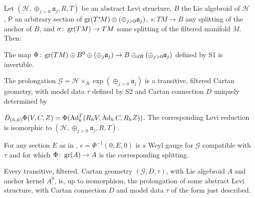 \documentclass[leqno,12pt]{amsart} %
\begin{document}
\begin{theorem}\mbox{}\newline
  Let $({\mathcal H}, \oplus_{j>0}{\mathfrak a}_j, R, T)$ be an abstract Levi structure,
  $B$ the Lie algebroid of ${\mathcal H} $, $\mathsf{P}$ an arbitrary section of
  $\operatorname{\operatorname{gr}}(T^*\!M)\otimes(\oplus_{j>0}{\mathfrak a}_j)$, $s \colon TM \rightarrow B$ any
  splitting of the anchor of $B$, and $\sigma \colon \operatorname{\operatorname{gr}}(TM) \rightarrow TM $ some
  splitting of the filtered manifold $M$. Then:
  \begin{conditions}
  \item\label{chh01} The map
    $\Phi \colon \operatorname{\operatorname{gr}}(TM) \oplus B^0 \oplus (\oplus_j {\mathfrak a}_j) \rightarrow B
    \oplus_{dR}(\oplus_{j>0}{\mathfrak a}_j)$ defined by {\normalfont S1} is
    invertible.
  \item\label{chh02} The prolongation
    ${\mathcal G}  = {\mathcal H} \times_R\exp(\oplus_{j>0}{\mathfrak a}_j) $ is a transitive,
    filtered Cartan geometry, with model data $\tau $ defined by
    {\normalfont S2} and Cartan connection $D$ uniquely determined by
  \item[{\normalfont\bfseries S3$^\prime$.}]  \vspace{0.3\baselineskip} \quad
    $\bar D_{(h,k)}\Phi(V, C, Z) = \Phi(\operatorname{Ad}^T_k(R_hV, \operatorname{Ad}_h C, R_h Z))$.
    \vspace{0.3\baselineskip}\newline The corresponding Levi reduction is isomorphic to
    $({\mathcal H}, \oplus_{j>0}{\mathfrak a}_j, R, T)$.
  \item\label{chh02b} For any section $E$ as in ,
    $\epsilon = \Phi^{-1}(0, E, 0)$ is a Weyl gauge for ${\mathcal G} $ compatible with
    $\tau$ and for which $\Phi \colon \operatorname{\operatorname{gr}}(A) \rightarrow A$ is the corresponding
    splitting.
  \item\label{cch03}
    \vspace{0.5\baselineskip}
    Every transitive, filtered, Cartan geometry
    $({\mathcal G}, D, \tau)$, with Lie algebroid $A$ and anchor kernel $A^0$, is, up to
    isomorphism, the prolongation of some abstract Levi structure, with Cartan
    connection $D $ and model data $\tau $ of the form just described.
  \end{conditions}
\end{theorem}
\end{document}
